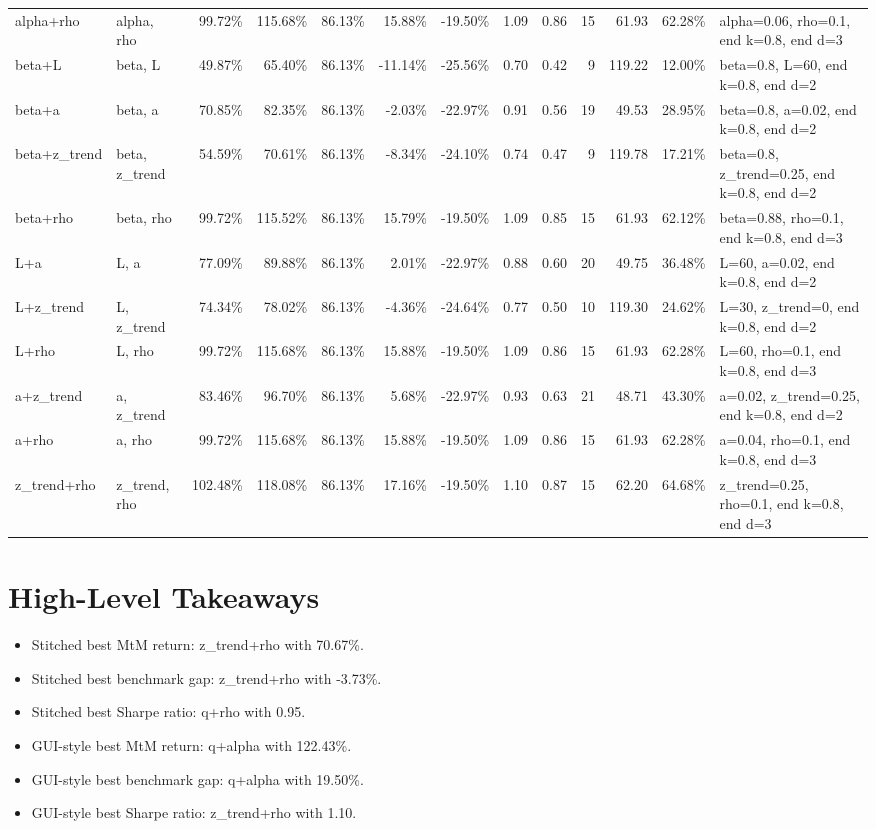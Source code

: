 \documentclass[10pt]{article}
\begin{document}
\begin{longtable}{p{0.9in}p{1.15in}rrrrrrrrrrp{1.1in}}
alpha+rho & alpha, rho & 99.72\% & 115.68\% & 86.13\% & 15.88\% & -19.50\% & 1.09 & 0.86 & 15 & 61.93 & 62.28\% & alpha=0.06, rho=0.1, end k=0.8, end d=3 \\
beta+L & beta, L & 49.87\% & 65.40\% & 86.13\% & -11.14\% & -25.56\% & 0.70 & 0.42 & 9 & 119.22 & 12.00\% & beta=0.8, L=60, end k=0.8, end d=2 \\
beta+a & beta, a & 70.85\% & 82.35\% & 86.13\% & -2.03\% & -22.97\% & 0.91 & 0.56 & 19 & 49.53 & 28.95\% & beta=0.8, a=0.02, end k=0.8, end d=2 \\
beta+z\_trend & beta, z\_trend & 54.59\% & 70.61\% & 86.13\% & -8.34\% & -24.10\% & 0.74 & 0.47 & 9 & 119.78 & 17.21\% & beta=0.8, z\_trend=0.25, end k=0.8, end d=2 \\
beta+rho & beta, rho & 99.72\% & 115.52\% & 86.13\% & 15.79\% & -19.50\% & 1.09 & 0.85 & 15 & 61.93 & 62.12\% & beta=0.88, rho=0.1, end k=0.8, end d=3 \\
L+a & L, a & 77.09\% & 89.88\% & 86.13\% & 2.01\% & -22.97\% & 0.88 & 0.60 & 20 & 49.75 & 36.48\% & L=60, a=0.02, end k=0.8, end d=2 \\
L+z\_trend & L, z\_trend & 74.34\% & 78.02\% & 86.13\% & -4.36\% & -24.64\% & 0.77 & 0.50 & 10 & 119.30 & 24.62\% & L=30, z\_trend=0, end k=0.8, end d=2 \\
L+rho & L, rho & 99.72\% & 115.68\% & 86.13\% & 15.88\% & -19.50\% & 1.09 & 0.86 & 15 & 61.93 & 62.28\% & L=60, rho=0.1, end k=0.8, end d=3 \\
a+z\_trend & a, z\_trend & 83.46\% & 96.70\% & 86.13\% & 5.68\% & -22.97\% & 0.93 & 0.63 & 21 & 48.71 & 43.30\% & a=0.02, z\_trend=0.25, end k=0.8, end d=2 \\
a+rho & a, rho & 99.72\% & 115.68\% & 86.13\% & 15.88\% & -19.50\% & 1.09 & 0.86 & 15 & 61.93 & 62.28\% & a=0.04, rho=0.1, end k=0.8, end d=3 \\
z\_trend+rho & z\_trend, rho & 102.48\% & 118.08\% & 86.13\% & 17.16\% & -19.50\% & 1.10 & 0.87 & 15 & 62.20 & 64.68\% & z\_trend=0.25, rho=0.1, end k=0.8, end d=3 \\
\bottomrule
\end{longtable}
\normalsize

\section*{High-Level Takeaways}
\begin{itemize}
    \item Stitched best MtM return: z\_trend+rho with 70.67\%.
    \item Stitched best benchmark gap: z\_trend+rho with -3.73\%.
    \item Stitched best Sharpe ratio: q+rho with 0.95.
    \item GUI-style best MtM return: q+alpha with 122.43\%.
    \item GUI-style best benchmark gap: q+alpha with 19.50\%.
    \item GUI-style best Sharpe ratio: z\_trend+rho with 1.10.
\end{itemize}
\end{document}
